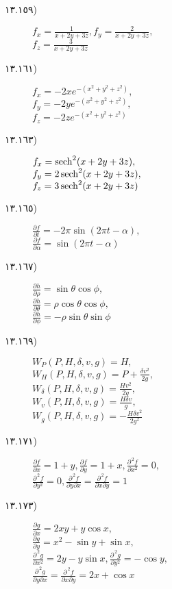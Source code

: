 \begin {description}
\item [
\protect ١٣.\protect ١٥٩)
]
 $f_x=\tfrac {1}{x+2y+3z},f_y=\tfrac {2}{x+2y+3z},$\\ $f_z=\tfrac {3}{x+2y+3z}$ 
\item [
\protect ١٣.\protect ١٦١)
]
 $f_x=-2xe^{-(x^2+y^2+z^2)},$\\ $f_y=-2ye^{-(x^2+y^2+z^2)},$\\ $f_z=-2ze^{-(x^2+y^2+z^2)}$ 
\item [
\protect ١٣.\protect ١٦٣)
]
 $f_x=\operatorname{sech} ^2(x+2y+3z),$\\ $f_y=2\operatorname{sech} ^2(x+2y+3z),$\\ $f_z=3\operatorname{sech} ^2(x+2y+3z)$ 
\item [
\protect ١٣.\protect ١٦٥)
]
 $\tfrac {\partial f}{\partial t}=-2\pi \sin (2\pi t-\alpha ),$\\ $\tfrac {\partial f}{\partial \alpha }=\sin (2\pi t-\alpha )$ 
\item [
\protect ١٣.\protect ١٦٧)
]
 $\tfrac {\partial h}{\partial \rho }=\sin \theta \cos \phi ,$\\ $\tfrac {\partial h}{\partial \theta }=\rho \cos \theta \cos \phi ,$\\ $\frac {\partial h}{\partial \phi }=-\rho \sin \theta \sin \phi $ 
\item [
\protect ١٣.\protect ١٦٩)
]
 $W_P(P,H,\delta ,v,g)=H,$\\ $W_H(P,H,\delta ,v,g)=P+\tfrac {\delta v^2}{2g},$\\ $W_{\delta }(P,H,\delta ,v,g)=\tfrac {Hv^2}{2g},$\\ $W_v(P,H,\delta ,v,g)=\tfrac {H\delta v}{g},$\\ $W_g(P,H,\delta ,v,g)=-\tfrac {H\delta v^2}{2g^2}$ 
\item [
\protect ١٣.\protect ١٧١)
]
 $\tfrac {\partial f}{\partial x}=1+y, \tfrac {\partial f}{\partial y}=1+x,\frac {\partial ^{\,2} f}{\partial x^2}=0,$\\ $\frac {\partial ^{\,2} f}{\partial y^2}=0,\frac {\partial ^{\,2} f}{\partial y\partial x}=\frac {\partial ^{\,2} f}{\partial x\partial y}=1$ 
\item [
\protect ١٣.\protect ١٧٣)
]
 $\tfrac {\partial g}{\partial x}=2xy+y\cos x,$\\ $\tfrac {\partial g}{\partial y}=x^2-\sin y+\sin x,$\\ $\frac {\partial ^{\,2} g}{\partial x^2}=2y-y\sin x,\frac {\partial ^{\,2} g}{\partial y^2}=-\cos y,$\\ $\frac {\partial ^{\,2} g}{\partial y\partial x}=\frac {\partial ^{\,2} f}{\partial x\partial y}=2x+\cos x$ 

\end{description}
